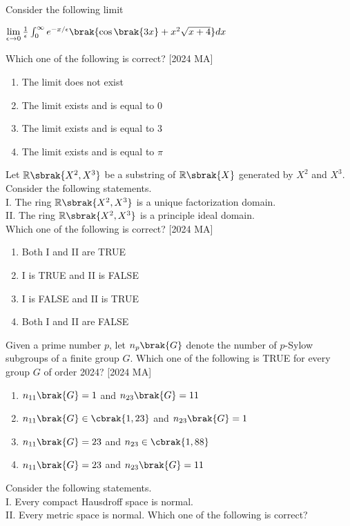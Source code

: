 \iffalse
\title{2024-MA-14-26}
\author{EE24BTECH11010 - BALAJI B}
\section{ma}
\chapter{2024}
\fi
    \item Consider the following limit 
    \begin{center}
        $\lim\limits_{\epsilon \to 0} \frac{1}{\epsilon} \int_0^\infty e^{-x / \epsilon}\brak{\cos{\brak{3x}} + x^2  \sqrt{x +4}}dx$
    \end{center}
    Which one of the following is correct? \hfill [2024 MA]
    \begin{enumerate}
        \item The limit does not exist
        \item The limit exists and is equal to 0
        \item The limit exists and is equal to 3
        \item The limit exists and is equal to $\pi$
    \end{enumerate}
    \item Let $\mathbb{R}\sbrak{X^2, X^3}$ be a substring of $\mathbb{R} \sbrak{X}$ generated by $X^2$ and $X^3$. Consider the following
statements.\\
I. The ring $\mathbb{R} \sbrak{X^2, X^3}$ is a unique factorization domain.\\
II. The ring $\mathbb{R} \sbrak{X^2, X^3}$ is a principle ideal domain. \\
Which one of the following is correct? \hfill [2024 MA]
\begin{enumerate}
    \item Both I and II are TRUE
    \item I is TRUE and II is FALSE
    \item I is FALSE and II is TRUE
    \item Both I and II are FALSE
\end{enumerate}
\item Given a prime number  $p$, let $n_p\brak{G}$ denote the number of $p$-Sylow subgroups of a finite group $G$. Which one of the following is TRUE for every group $G$ of order 2024? \hfill [2024 MA]
\begin{enumerate}
    \item $n_{11}\brak{G} = 1$ and $ n_{23}\brak{G} = 11$
    \item $n_{11}\brak{G} \in \cbrak{1,23}$ and 
    $n_{23}\brak{G} = 1$
    \item $n_{11}\brak{G} = 23$ and $n_{23} \in \cbrak{1,88}$
    \item $n_{11}\brak{G} = 23$ and $n_{23}\brak{G} = 11$
\end{enumerate}
\item Consider the following statements.\\
I. Every compact Hausdroff space is normal. \\
II. Every metric space is normal.
Which one of the following is correct?

